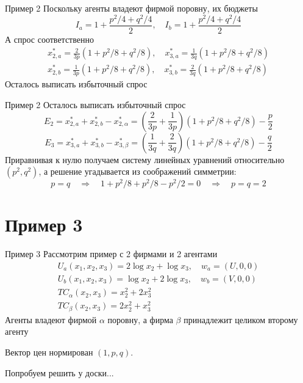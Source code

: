 \documentclass{beamer}
\begin{document}
\begin{frame}{Пример 2}
Поскольку агенты владеют фирмой поровну, их бюджеты
$$I_a = 1 + \frac{p^2/4 + q^2/4}{2}, \quad I_b = 1 + \frac{p^2/4 + q^2/4}{2}$$
А спрос соответственно
\begin{gather*}
	x^*_{2,a} = \frac{2}{3p}(1 + p^2/8 + q^2/8), \quad x^*_{3,a} = \frac{1}{3q}(1 + p^2/8 + q^2/8)\\
	x^*_{2,b} = \frac{1}{3p}(1 + p^2/8 + q^2/8), \quad x^*_{3,b} = \frac{2}{3q}(1 + p^2/8 + q^2/8)
\end{gather*}
Осталось выписать избыточный спрос
\end{frame}

\begin{frame}{Пример 2}
Осталось выписать избыточный спрос
$$E_2 = x^*_{2,a} + x^*_{2,b} - x^*_{2,\alpha} = (\frac{2}{3p} + \frac{1}{3p})(1 + p^2/8 + q^2/8) - \frac{p}{2}$$
$$E_3 = x^*_{3,a} + x^*_{3,b} - x^*_{3,\beta} = (\frac{1}{3q} + \frac{2}{3q})(1 + p^2/8 + q^2/8) - \frac{q}{2}$$
Приравнивая к нулю получаем систему линейных уравнений относительно $(p^2,q^2)$, а решение угадывается из соображений симметрии:
$$ p = q \quad \Rightarrow \quad 1+ p^2/8 + p^2/8 - p^2/2 = 0 \quad \Rightarrow \quad p = q = 2$$
\end{frame}

\section{Пример 3}

\begin{frame}{Пример 3}
Рассмотрим пример с 2 фирмами и 2 агентами
\begin{gather*}
	U_a(x_1, x_2, x_3) = 2 \log x_2 + \log x_3, \quad w_a = (U,0,0)\\
	U_b(x_1, x_2, x_3) = \log x_2 + 2 \log x_3, \quad w_b = (V,0,0)\\
	TC_{\alpha}(x_2, x_3) = x_2^2 + 2 x_3^2 \\
	TC_{\beta}(x_2, x_3) = 2 x_2^2 + x_3^2 
\end{gather*}
Агенты владеют фирмой $\alpha$ поровну, а фирма $\beta$ принадлежит целиком второму агенту

Вектор цен нормирован $(1, p, q)$.

Попробуем решить у доски...
\end{frame}
\end{document}
